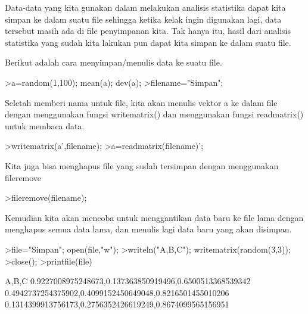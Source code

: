 \documentclass[a4paper,10pt]{article}
\begin{document}
\begin{eulernotebook}
\begin{eulercomment}
\begin{eulercomment}
\begin{eulercomment}
\begin{eulercomment}
\begin{eulercomment}
\begin{eulercomment}
\begin{eulercomment}
\begin{eulercomment}
\begin{eulercomment}
\begin{eulercomment}
\begin{eulercomment}
\begin{eulercomment}
\begin{eulercomment}
\end{eulercomment}
\begin{eulercomment}
Data-data yang kita gunakan dalam melakukan analisis statistika dapat
kita simpan ke dalam suatu file sehingga ketika kelak ingin digunakan
lagi, data tersebut masih ada di file penyimpanan kita. Tak hanya itu,
hasil dari analisis statistika yang sudah kita lakukan pun dapat kita
simpan ke dalam suatu file.

Berikut adalah cara menyimpan/menulis data ke suatu file.
\end{eulercomment}
\begin{eulerprompt}
>a=random(1,100); mean(a); dev(a);
>filename="Simpan";
\end{eulerprompt}
\begin{eulercomment}
Seletah memberi nama untuk file, kita akan menulis vektor a ke dalam
file dengan menggunakan fungsi writematrix() dan menggunakan fungsi
readmatrix() untuk membaca data.
\end{eulercomment}
\begin{eulerprompt}
>writematrix(a',filename);
>a=readmatrix(filename)';
\end{eulerprompt}
\begin{eulercomment}
Kita juga bisa menghapus file yang sudah tersimpan dengan menggunakan
fileremove
\end{eulercomment}
\begin{eulerprompt}
>fileremove(filename);
\end{eulerprompt}
\begin{eulercomment}
Kemudian kita akan mencoba untuk menggantikan data baru ke file lama
dengan menghapus semua data lama, dan menulis lagi data baru yang akan
disimpan.
\end{eulercomment}
\begin{eulerprompt}
>file="Simpan"; open(file,"w");
>writeln("A,B,C"); writematrix(random(3,3));
>close();
>printfile(file)
\end{eulerprompt}
\begin{euleroutput}
  A,B,C
  0.9227008975248673,0.137363850919496,0.6500513368539342
  0.4942737254375902,0.4099152450649048,0.8216501455010206
  0.1314399913756173,0.2756352426619249,0.8674099565156951
  

\end{euleroutput}
\end{eulercomment}
\end{eulercomment}
\end{eulercomment}
\end{eulercomment}
\end{eulercomment}
\end{eulercomment}
\end{eulercomment}
\end{eulercomment}
\end{eulercomment}
\end{eulercomment}
\end{eulercomment}
\end{eulercomment}
\end{eulernotebook}
\end{document}
